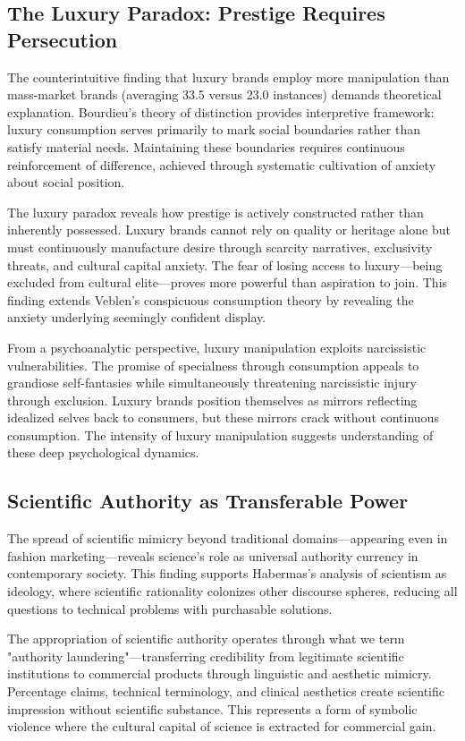 \subsection{The Luxury Paradox: Prestige Requires Persecution}

The counterintuitive finding that luxury brands employ more manipulation than mass-market brands (averaging 33.5 versus 23.0 instances) demands theoretical explanation. Bourdieu's theory of distinction provides interpretive framework: luxury consumption serves primarily to mark social boundaries rather than satisfy material needs. Maintaining these boundaries requires continuous reinforcement of difference, achieved through systematic cultivation of anxiety about social position.

The luxury paradox reveals how prestige is actively constructed rather than inherently possessed. Luxury brands cannot rely on quality or heritage alone but must continuously manufacture desire through scarcity narratives, exclusivity threats, and cultural capital anxiety. The fear of losing access to luxury—being excluded from cultural elite—proves more powerful than aspiration to join. This finding extends Veblen's conspicuous consumption theory by revealing the anxiety underlying seemingly confident display.

From a psychoanalytic perspective, luxury manipulation exploits narcissistic vulnerabilities. The promise of specialness through consumption appeals to grandiose self-fantasies while simultaneously threatening narcissistic injury through exclusion. Luxury brands position themselves as mirrors reflecting idealized selves back to consumers, but these mirrors crack without continuous consumption. The intensity of luxury manipulation suggests understanding of these deep psychological dynamics.

\subsection{Scientific Authority as Transferable Power}

The spread of scientific mimicry beyond traditional domains—appearing even in fashion marketing—reveals science's role as universal authority currency in contemporary society. This finding supports Habermas's analysis of scientism as ideology, where scientific rationality colonizes other discourse spheres, reducing all questions to technical problems with purchasable solutions.

The appropriation of scientific authority operates through what we term "authority laundering"—transferring credibility from legitimate scientific institutions to commercial products through linguistic and aesthetic mimicry. Percentage claims, technical terminology, and clinical aesthetics create scientific impression without scientific substance. This represents a form of symbolic violence where the cultural capital of science is extracted for commercial gain.

